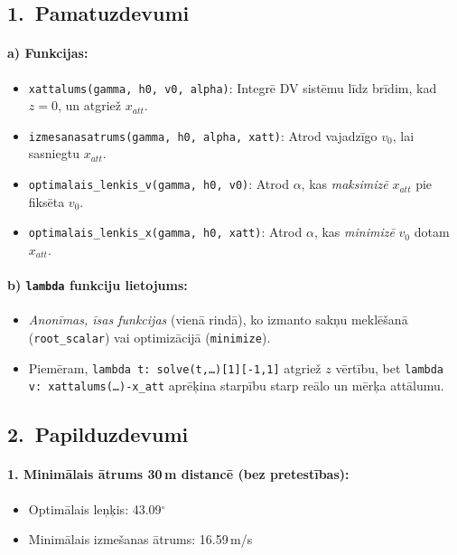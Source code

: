\documentclass[12pt]{article}
\begin{document}
\subsection*{1.~Pamatuzdevumi}

\paragraph{a) Funkcijas:}
\begin{itemize}
\item \texttt{xattalums(gamma, h0, v0, alpha)}: Integrē DV sistēmu līdz brīdim, kad $z=0$, un atgriež $x_{att}$. 
\item \texttt{izmesanasatrums(gamma, h0, alpha, xatt)}: Atrod vajadzīgo $v_0$, lai sasniegtu $x_{att}$. 
\item \texttt{optimalais\_lenkis\_v(gamma, h0, v0)}: Atrod $\alpha$, kas \emph{maksimizē} $x_{att}$ pie fiksēta $v_0$. 
\item \texttt{optimalais\_lenkis\_x(gamma, h0, xatt)}: Atrod $\alpha$, kas \emph{minimizē} $v_0$ dotam $x_{att}$. 
\end{itemize}

\paragraph{b) \texttt{lambda} funkciju lietojums:}
\begin{itemize}
\item \emph{Anonīmas, īsas funkcijas} (vienā rindā), ko izmanto sakņu meklēšanā (\texttt{root\_scalar}) vai optimizācijā (\texttt{minimize}).
\item Piemēram, \texttt{lambda t: \newline solve(t,\dots)[1][-1,1]} atgriež $z$ vērtību, bet \texttt{lambda v: xattalums(\dots)-x\_att} aprēķina starpību starp reālo un mērķa attālumu.
\end{itemize}

\subsection*{2.~Papilduzdevumi}

\paragraph{1. Minimālais ātrums 30\,m distancē (bez pretestības):}
\begin{itemize}
\item Optimālais leņķis: 43.09$^\circ$
\item Minimālais izmešanas ātrums: 16.59\,m/s
\end{itemize}
\end{document}

